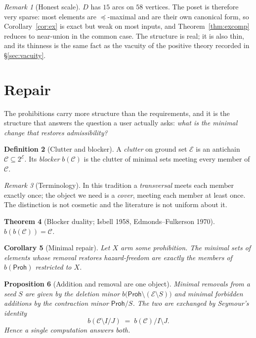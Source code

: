 \documentclass[11pt]{article}
\theoremstyle{definition}
\newtheorem{definition}{Definition}[section]
\theoremstyle{plain}
\newtheorem{theorem}[definition]{Theorem}
\newtheorem{proposition}[definition]{Proposition}
\newtheorem{corollary}[definition]{Corollary}
\theoremstyle{remark}
\newtheorem{remark}[definition]{Remark}
\newcommand{\El}{\mathcal{E}}
\newcommand{\Haz}{\mathsf{Proh}}
\begin{document}
\begin{remark}[Honest scale]
$D$ has $15$ arcs on $58$ vertices. The poset is therefore very sparse: most
elements are $\preceq$-maximal and are their own canonical form, so
Corollary~\ref{cor:ex} is exact but weak on most inputs, and
Theorem~\ref{thm:excomp} reduces to near-union in the common case. The structure
is real; it is also thin, and its thinness is the same fact as the vacuity of the
positive theory recorded in \S\ref{sec:vacuity}.
\end{remark}

\section{Repair}

The prohibitions carry more structure than the requirements, and it is the
structure that answers the question a user actually asks: \emph{what is the
minimal change that restores admissibility?}

\begin{definition}[Clutter and blocker]
A \emph{clutter} on ground set $\El$ is an antichain $\mathcal{C} \subseteq 2^{\El}$.
Its \emph{blocker} $b(\mathcal{C})$ is the clutter of minimal sets meeting every
member of $\mathcal{C}$.
\end{definition}

\begin{remark}[Terminology]
In this tradition a \emph{transversal} meets each member exactly once; the object
we need is a \emph{cover}, meeting each member at least once. The distinction is
not cosmetic and the literature is not uniform about it.
\end{remark}

\begin{theorem}[Blocker duality; Isbell 1958, Edmonds--Fulkerson 1970]\label{thm:blocker}
$b(b(\mathcal{C})) = \mathcal{C}$.
\end{theorem}

\begin{corollary}[Minimal repair]
Let $X$ arm some prohibition. The minimal sets of elements whose removal restores
hazard-freedom are exactly the members of $b(\Haz)$ restricted to $X$.
\end{corollary}

\begin{proposition}[Addition and removal are one object]\label{prop:oneobject}
Minimal removals from a seed $S$ are given by the deletion minor
$b\bigl(\Haz \setminus (\El \setminus S)\bigr)$ and minimal forbidden additions by
the contraction minor $\Haz / S$. The two are exchanged by Seymour's identity
\[
  b(\mathcal{C} \setminus I / J) \;=\; b(\mathcal{C}) / I \setminus J .
\]
Hence a single computation answers both.
\end{proposition}
\end{document}
